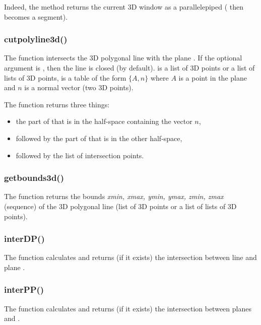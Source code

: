 Indeed, the  method returns the current 3D window as a parallelepiped ( then becomes a segment).

\subsubsection{cutpolyline3d()}

The function  intersects the 3D polygonal line  with the plane . If the optional argument  is \true, then the line is closed (\false by default).  is a list of 3D points or a list of lists of 3D points,  is a table of the form $\{A,n\}$ where $A$ is a point in the plane and $n$ is a normal vector (two 3D points).

The function returns three things:
\begin{itemize}
\item the part of  that is in the half-space containing the vector $n$,
\item followed by the part of  that is in the other half-space,
\item followed by the list of intersection points.
\end{itemize}

\subsubsection{getbounds3d()}

The function  returns the bounds \emph{xmin, xmax, ymin, ymax, zmin, zmax} (sequence) of the 3D polygonal line  (list of 3D points or a list of lists of 3D points).

\subsubsection{interDP()}

The function  calculates and returns (if it exists) the intersection between line  and plane .

\subsubsection{interPP()}

The function  calculates and returns (if it exists) the intersection between planes  and .

